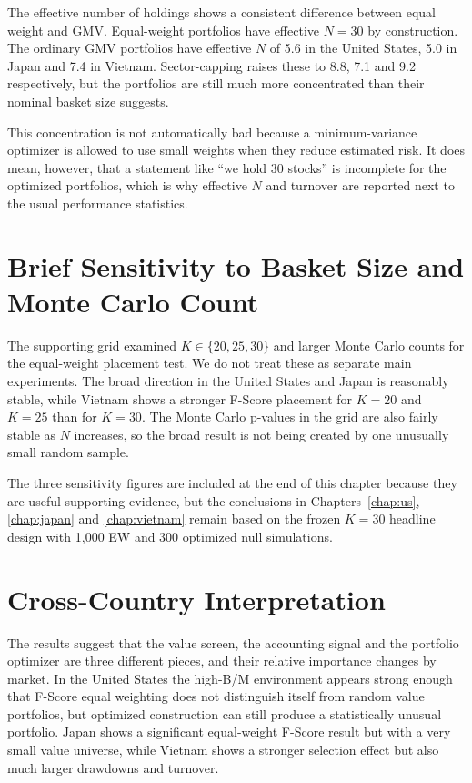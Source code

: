\documentclass[11pt,a4paper]{report}
\numberwithin{figure}{chapter}
\numberwithin{table}{chapter}
\numberwithin{equation}{chapter}
\begin{document}
The effective number of holdings shows a consistent difference between equal weight and GMV. Equal-weight portfolios have effective $N=30$ by construction. The ordinary GMV portfolios have effective $N$ of 5.6 in the United States, 5.0 in Japan and 7.4 in Vietnam. Sector-capping raises these to 8.8, 7.1 and 9.2 respectively, but the portfolios are still much more concentrated than their nominal basket size suggests.

This concentration is not automatically bad because a minimum-variance optimizer is allowed to use small weights when they reduce estimated risk. It does mean, however, that a statement like ``we hold 30 stocks'' is incomplete for the optimized portfolios, which is why effective $N$ and turnover are reported next to the usual performance statistics.

\section{Brief Sensitivity to Basket Size and Monte Carlo Count}
\label{sec:grid_sensitivity}

The supporting grid examined $K\in\{20,25,30\}$ and larger Monte Carlo counts for the equal-weight placement test. We do not treat these as separate main experiments. The broad direction in the United States and Japan is reasonably stable, while Vietnam shows a stronger F-Score placement for $K=20$ and $K=25$ than for $K=30$. The Monte Carlo p-values in the grid are also fairly stable as $N$ increases, so the broad result is not being created by one unusually small random sample.

The three sensitivity figures are included at the end of this chapter because they are useful supporting evidence, but the conclusions in Chapters~\ref{chap:us}, \ref{chap:japan} and \ref{chap:vietnam} remain based on the frozen $K=30$ headline design with 1,000 EW and 300 optimized null simulations.

\section{Cross-Country Interpretation}

The results suggest that the value screen, the accounting signal and the portfolio optimizer are three different pieces, and their relative importance changes by market. In the United States the high-B/M environment appears strong enough that F-Score equal weighting does not distinguish itself from random value portfolios, but optimized construction can still produce a statistically unusual portfolio. Japan shows a significant equal-weight F-Score result but with a very small value universe, while Vietnam shows a stronger selection effect but also much larger drawdowns and turnover.
\end{document}
